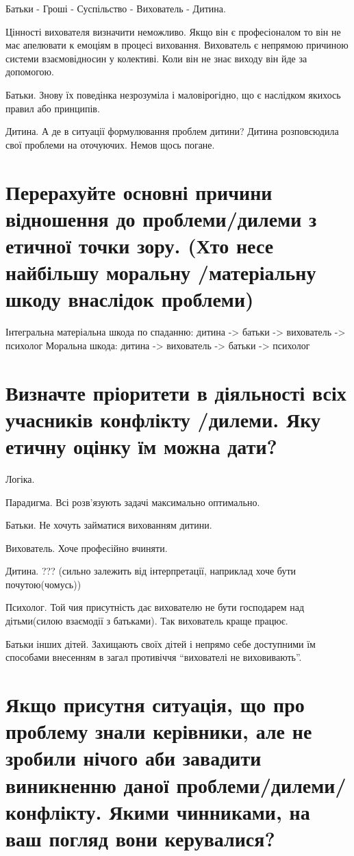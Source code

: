 \documentclass[a4paper,12pt]{article}
\begin{document}
    Батьки - Гроші - Суспільство - Вихователь - Дитина.

    Цінності вихователя визначити неможливо. Якщо він є професіоналом то він не має апелювати к емоціям в процесі виховання.
    Вихователь є непрямою причиною системи взаємовідносин у колективі. Коли він не знає виходу він йде за допомогою.

    Батьки. Знову їх поведінка незрозуміла і маловірогідно, що є наслідком якихось правил або принципів.

    Дитина. А де в ситуації формулювання проблем дитини? Дитина розповсюдила свої проблеми на оточуючих. Немов щось погане.


    \section{Перерахуйте основні причини відношення до проблеми/дилеми з етичної точки зору. (Хто несе найбільшу моральну /матеріальну шкоду внаслідок проблеми)}
    Інтегральна матеріальна шкода по спаданню: дитина -> батьки -> вихователь -> психолог \newline
    Моральна шкода: дитина -> вихователь -> батьки -> психолог

    \section{Визначте пріоритети в діяльності всіх учасників конфлікту /дилеми. Яку етичну оцінку їм можна дати?}
    Логіка.

    Парадигма. Всі розв'язують задачі максимально оптимально.

    Батьки. Не хочуть займатися вихованням дитини.

    Вихователь. Хоче професійно вчиняти.

    Дитина. ??? (сильно залежить від інтерпретації, наприклад хоче бути почутою(чомусь))

    Психолог. Той чия присутність дає вихователю не бути господарем над дітьми(силою взаємодії з батьками). Так вихователь краще працює.

    Батьки інших дітей. Захищають своїх дітей і непрямо себе доступними їм способами внесенням в загал противіччя ``вихователі не виховивають''.

    \section{Якщо присутня ситуація, що про проблему знали керівники, але не зробили нічого аби завадити виникненню даної проблеми/дилеми/конфлікту. Якими чинниками, на ваш погляд вони керувалися?}
\end{document}
